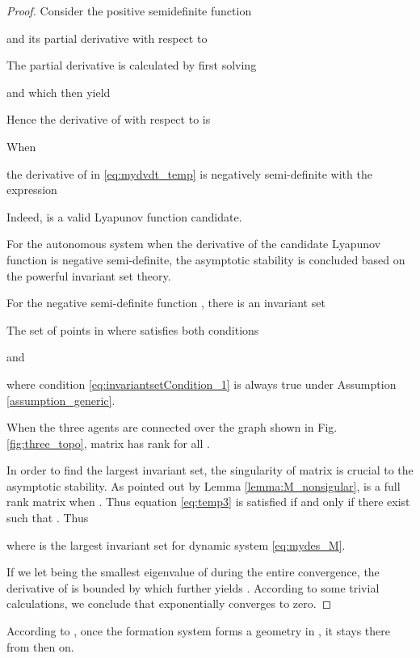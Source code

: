 \documentclass[times]{rncauth}
\begin{document}
\renewcommand{\proofname}{Proof of Theorem \ref{thm:stable}}
\begin{proof}
Consider the positive semidefinite function

and its partial derivative with respect to 

The partial derivative  is calculated by first solving

  and 
which then yield


Hence the derivative of  with respect to  is



 When

the derivative of  in \eqref{eq:mydvdt_temp} is
negatively semi-definite with the expression

Indeed,  is a valid Lyapunov function candidate.


For the autonomous system when the derivative of the candidate
Lyapunov function is negative semi-definite, the asymptotic
stability is concluded based on the powerful invariant set theory.

For the negative semi-definite function , there is an
invariant set

The set of points in  where 
satisfies both conditions

and

where condition \eqref{eq:invariantsetCondition_1} is always true
under Assumption \ref{assumption_generic}.

When the three agents are connected over the graph shown in Fig.
\ref{fig:three_topo}, matrix  has rank  for all
.

In order to find the largest invariant set, the singularity of
matrix  is crucial to the asymptotic stability. As
pointed out by Lemma \ref{lemma:M_nonsigular},  is a
full rank matrix when . Thus equation
\eqref{eq:temp3} is satisfied if and only if there exist
 such that
. Thus

where  is the largest
invariant set for dynamic system \eqref{eq:mydes_M}.





If we let  being the smallest eigenvalue of 
during the entire convergence, the derivative of  is
bounded by 
which further yields . According to some trivial calculations, we conclude
that  exponentially
converges to zero.
\end{proof}
\renewcommand{\proofname}{PROOF}

According to , once the formation system forms a
geometry in , it stays there from then on.
\end{document}

